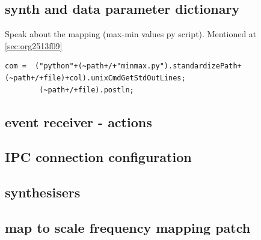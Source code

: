 \documentclass[11pt]{article}
\begin{document}
\subsection{synth and data parameter dictionary}
\label{sec:orgcc3db5c}
Speak about the mapping (max-min values py script).  Mentioned at \ref{sec:org2513f09}
\begin{verbatim}
com =  ("python"+(~path+/+"minmax.py").standardizePath+(~path+/+file)+col).unixCmdGetStdOutLines;
        (~path+/+file).postln;
\end{verbatim}
\subsection{event receiver - actions}
\label{sec:org6b3ac2a}
\subsection{IPC connection configuration}
\label{sec:org7850937}
\subsection{synthesisers}
\label{sec:org1d08186}
\subsection{map to scale frequency mapping patch}
\label{sec:org1a0bda9}
\end{document}
